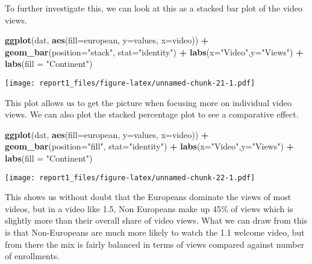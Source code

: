 \documentclass[
]{article}
\newenvironment{Shaded}{\begin{snugshade}}{\end{snugshade}}
\newcommand{\DataTypeTok}[1]{\textcolor[rgb]{0.13,0.29,0.53}{#1}}
\newcommand{\KeywordTok}[1]{\textcolor[rgb]{0.13,0.29,0.53}{\textbf{#1}}}
\newcommand{\NormalTok}[1]{#1}
\newcommand{\OperatorTok}[1]{\textcolor[rgb]{0.81,0.36,0.00}{\textbf{#1}}}
\newcommand{\StringTok}[1]{\textcolor[rgb]{0.31,0.60,0.02}{#1}}
\begin{document}
To further investigate this, we can look at this as a stacked bar plot
of the video views.

\begin{Shaded}
\begin{Highlighting}[]
\KeywordTok{ggplot}\NormalTok{(dat, }\KeywordTok{aes}\NormalTok{(}\DataTypeTok{fill=}\NormalTok{european, }\DataTypeTok{y=}\NormalTok{values, }\DataTypeTok{x=}\NormalTok{video)) }\OperatorTok{+}\StringTok{ }
\StringTok{  }\KeywordTok{geom_bar}\NormalTok{(}\DataTypeTok{position=}\StringTok{"stack"}\NormalTok{, }\DataTypeTok{stat=}\StringTok{"identity"}\NormalTok{) }\OperatorTok{+}\StringTok{ }\KeywordTok{labs}\NormalTok{(}\DataTypeTok{x=}\StringTok{"Video"}\NormalTok{,}\DataTypeTok{y=}\StringTok{"Views"}\NormalTok{) }\OperatorTok{+}\StringTok{ }
\StringTok{  }\KeywordTok{labs}\NormalTok{(}\DataTypeTok{fill =} \StringTok{"Continent"}\NormalTok{)}
\end{Highlighting}
\end{Shaded}

\texttt{[image: report1\_files/figure-latex/unnamed-chunk-21-1.pdf]}

This plot allows us to get the picture when focusing more on individual
video views. We can also plot the stacked percentage plot to see a
comparative effect.

\begin{Shaded}
\begin{Highlighting}[]
\KeywordTok{ggplot}\NormalTok{(dat, }\KeywordTok{aes}\NormalTok{(}\DataTypeTok{fill=}\NormalTok{european, }\DataTypeTok{y=}\NormalTok{values, }\DataTypeTok{x=}\NormalTok{video)) }\OperatorTok{+}\StringTok{ }
\StringTok{  }\KeywordTok{geom_bar}\NormalTok{(}\DataTypeTok{position=}\StringTok{"fill"}\NormalTok{, }\DataTypeTok{stat=}\StringTok{"identity"}\NormalTok{) }\OperatorTok{+}\StringTok{ }\KeywordTok{labs}\NormalTok{(}\DataTypeTok{x=}\StringTok{"Video"}\NormalTok{,}\DataTypeTok{y=}\StringTok{"Views"}\NormalTok{) }\OperatorTok{+}\StringTok{ }
\StringTok{  }\KeywordTok{labs}\NormalTok{(}\DataTypeTok{fill =} \StringTok{"Continent"}\NormalTok{)}
\end{Highlighting}
\end{Shaded}

\texttt{[image: report1\_files/figure-latex/unnamed-chunk-22-1.pdf]}

This shows us without doubt that the Europeans dominate the views of
most videos, but in a video like 1.5, Non Europeans make up 45\% of
views which is slightly more than their overall share of video views.
What we can draw from this is that Non-Europeans are much more likely to
watch the 1.1 welcome video, but from there the mix is fairly balanced
in terms of views compared against number of enrollments.
\end{document}

